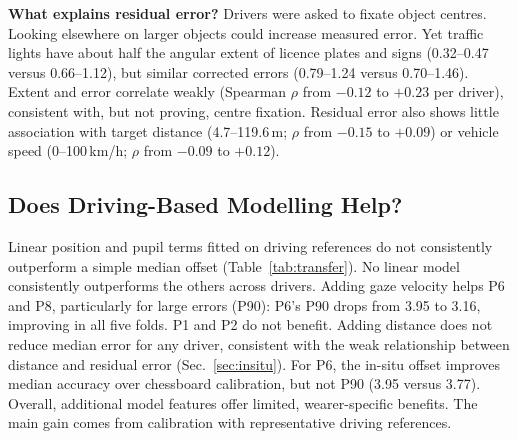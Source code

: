 \noindent\textbf{What explains residual error?}
Drivers were asked to fixate object centres. Looking
elsewhere on larger objects could increase measured error.
Yet traffic lights have about half the angular extent of
licence plates and signs (0.32--0.47\dg{} versus
0.66--1.12\dg{}), but similar corrected errors
(0.79--1.24\dg{} versus 0.70--1.46\dg{}).
Extent and error correlate weakly (Spearman $\rho$
from $-0.12$ to $+0.23$ per driver), consistent with,
but not proving, centre fixation. Residual error also
shows little association with target distance
(4.7--119.6\,m; $\rho$ from $-0.15$ to $+0.09$)
or vehicle speed (0--100\,km/h;
$\rho$ from $-0.09$ to $+0.12$).

\subsection{Does Driving-Based Modelling Help?}

Linear position and pupil terms fitted on driving references
do not consistently outperform a simple median offset
(Table~\ref{tab:transfer}). No linear model consistently
outperforms the others across drivers.
Adding gaze velocity helps P6 and P8, particularly for
large errors (P90): P6's P90 drops from 3.95\dg{} to
3.16\dg{}, improving in all five folds. P1 and P2 do not
benefit. Adding distance does not reduce median error for
any driver, consistent with the weak relationship between
distance and residual error (Sec.~\ref{sec:insitu}).
For P6, the in-situ offset improves median accuracy over
chessboard calibration, but not P90 (3.95\dg{} versus
3.77\dg{}). Overall, additional model features offer
limited, wearer-specific benefits. The main gain comes
from calibration with representative driving references.
